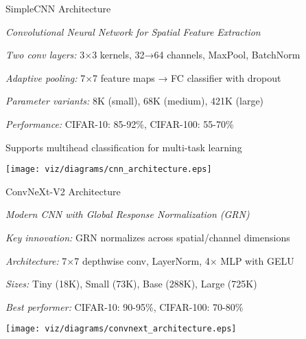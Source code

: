 \begin{slide}[\slideopts,toc={CNN}]{SimpleCNN Architecture}
  
  \emph{Convolutional Neural Network for Spatial Feature Extraction}
  
  \begin{itemize}
    \mpitem \emph{Two conv layers:} 3×3 kernels, 32→64 channels, MaxPool, BatchNorm
    
    \mpitem \emph{Adaptive pooling:} 7×7 feature maps → FC classifier with dropout
    
    \mpitem \emph{Parameter variants:} 8K (small), 68K (medium), 421K (large)
    
    \mpitem \emph{Performance:} CIFAR-10: 85-92\%, CIFAR-100: 55-70\%
    
    \mpitem Supports multihead classification for multi-task learning
  \end{itemize}
  
  \vspace{0.5em}
  \centerline{\texttt{[image: viz/diagrams/cnn\_architecture.eps]}}
\end{slide}

\begin{slide}[\slideopts,toc={ConvNeXt}]{ConvNeXt-V2 Architecture}
  
  \emph{Modern CNN with Global Response Normalization (GRN)}
  
  \begin{itemize}
    \mpitem \emph{Key innovation:} GRN normalizes across spatial/channel dimensions
    
    \mpitem \emph{Architecture:} 7×7 depthwise conv, LayerNorm, 4× MLP with GELU
    
    \mpitem \emph{Sizes:} Tiny (18K), Small (73K), Base (288K), Large (725K)
    
    \mpitem \emph{Best performer:} CIFAR-10: 90-95\%, CIFAR-100: 70-80\%
  \end{itemize}
  
  \vspace{0.5em}
  \centerline{\texttt{[image: viz/diagrams/convnext\_architecture.eps]}}
\end{slide}

